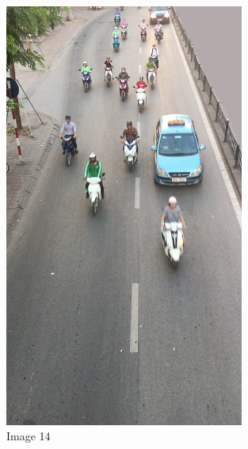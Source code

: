 \begin{center}
    \begin{figure}[H]
        \centering
      \includegraphics[width=0.7\textwidth]{Chapters/Fig/14}
      \caption{Image 14}
      \label{fig:img14}
  \end{figure}
\end{center}

